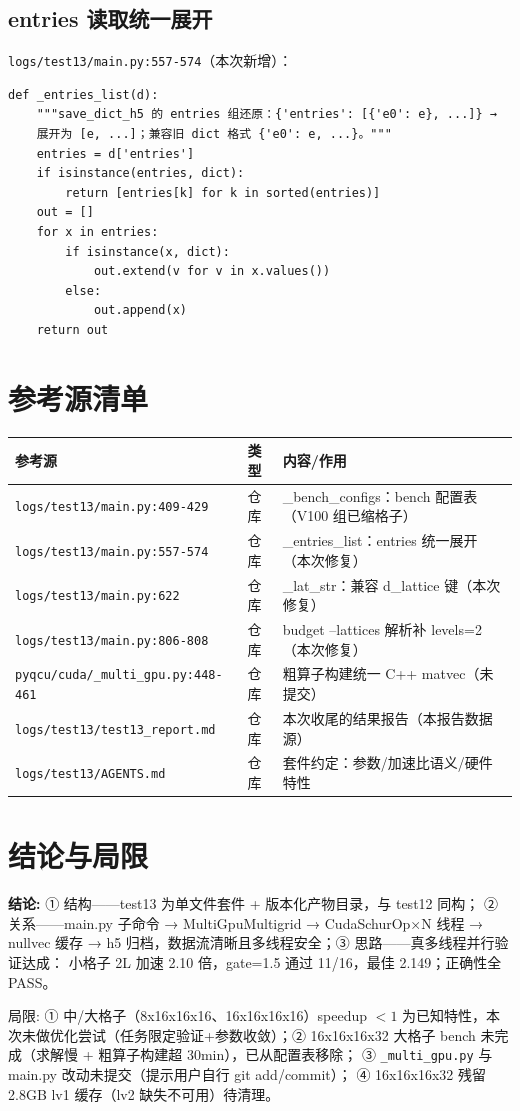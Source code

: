 \documentclass[UTF8]{ctexart}
\begin{document}
\subsection{entries 读取统一展开}
\texttt{logs/test13/main.py:557-574}（本次新增）：
\begin{lstlisting}
def _entries_list(d):
    """save_dict_h5 的 entries 组还原：{'entries': [{'e0': e}, ...]} →
    展开为 [e, ...]；兼容旧 dict 格式 {'e0': e, ...}。"""
    entries = d['entries']
    if isinstance(entries, dict):
        return [entries[k] for k in sorted(entries)]
    out = []
    for x in entries:
        if isinstance(x, dict):
            out.extend(v for v in x.values())
        else:
            out.append(x)
    return out
\end{lstlisting}

\section{参考源清单}
\begin{xltabular}{\textwidth}{llX}
\toprule
\textcolor{evidence}{参考源} & 类型 & 内容/作用 \\
\midrule
\endhead
\texttt{\nolinkurl{logs/test13/main.py:409-429}} & 仓库 & \_bench\_configs：bench 配置表（V100 组已缩格子） \\
\texttt{\nolinkurl{logs/test13/main.py:557-574}} & 仓库 & \_entries\_list：entries 统一展开（本次修复） \\
\texttt{\nolinkurl{logs/test13/main.py:622}} & 仓库 & \_lat\_str：兼容 d\_lattice 键（本次修复） \\
\texttt{\nolinkurl{logs/test13/main.py:806-808}} & 仓库 & budget --lattices 解析补 levels=2（本次修复） \\
\texttt{\nolinkurl{pyqcu/cuda/_multi_gpu.py:448-461}} & 仓库 & 粗算子构建统一 C++ matvec（未提交） \\
\texttt{\nolinkurl{logs/test13/test13_report.md}} & 仓库 & 本次收尾的结果报告（本报告数据源） \\
\texttt{\nolinkurl{logs/test13/AGENTS.md}} & 仓库 & 套件约定：参数/加速比语义/硬件特性 \\
\bottomrule
\end{xltabular}

\section{结论与局限}
\begin{conclbox}
\textbf{结论:} ① 结构——test13 为单文件套件 + 版本化产物目录，与 test12 同构；
② 关系——main.py 子命令 → MultiGpuMultigrid → CudaSchurOp×N 线程 → nullvec
缓存 → h5 归档，数据流清晰且多线程安全；③ 思路——真多线程并行验证达成：
小格子 2L 加速 2.10 倍，gate=1.5 通过 11/16，最佳 2.149；正确性全 PASS。
\end{conclbox}

\begin{warnbox}
\textcolor{warn}{局限:} ① 中/大格子（8x16x16x16、16x16x16x16）speedup $<1$
为已知特性，本次未做优化尝试（任务限定验证+参数收敛）；② 16x16x16x32
大格子 bench 未完成（求解慢 + 粗算子构建超 30min），已从配置表移除；
③ \texttt{\_multi\_gpu.py} 与 main.py 改动未提交（提示用户自行 git add/commit）；
④ 16x16x16x32 残留 2.8GB lv1 缓存（lv2 缺失不可用）待清理。
\end{warnbox}
\end{document}
